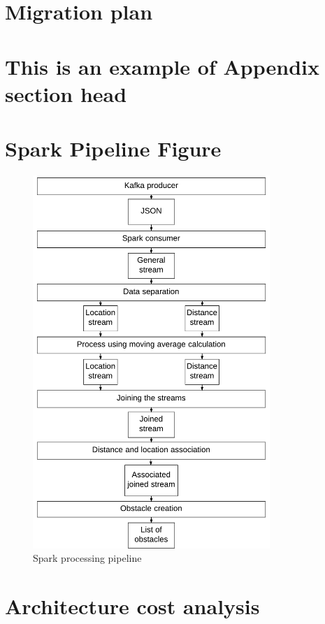 \documentclass[prodmode,acmtosem]{acmsmall} %
\begin{document}
\medskip

\section{Migration plan}
\label{app:MigrationPlan}
\section{This is an example of Appendix section head}

\pagebreak
\section{Spark Pipeline Figure}
\label{app:SparkPipeline}
\begin{figure}[!ht]
\label{fig:SparkPipeline}
\centering
\includegraphics[width=0.8\textwidth]{SparkPipeline.pdf}
\caption{Spark processing pipeline}
\end{figure}
\clearpage
\pagebreak
\section{Architecture cost analysis}
\label{ArchitectureCost}
\end{document}
